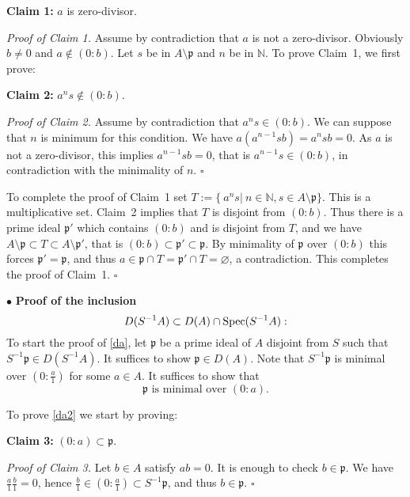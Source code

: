 \documentclass[parskip=half,fontsize=12pt]{scrartcl}%
\newcommand{\mf}{\mathfrak}
\newcommand{\ppp}{\mf p}
\newcommand{\bu}{\bullet}
\begin{document}
\textbf{Claim 1:} $a$ is zero-divisor.

\emph{Proof of Claim 1.} Assume by contradiction that $a$ is not a zero-divisor. Obviously $b\ne0$ and $a\notin(0:b)$. Let $s$ be in $A\setminus\ppp$ and $n$ be in $\mathbb N$. To prove Claim~1, we first prove:

\textbf{Claim 2:} $a^ns\notin(0:b)$.

\emph{Proof of Claim 2.} Assume by contradiction that $a^ns\in(0:b)$. We can suppose that $n$ is minimum for this condition. %
We have $a(a^{n-1}sb)=a^nsb=0$. As $a$ is not a zero-divisor, this implies $a^{n-1}sb=0$, that is $a^{n-1}s\in(0:b)$, in contradiction with the minimality of $n$. $\square$

To complete the proof of Claim~1 set $T:=\{\ a^ns|\ n\in\mathbb N,s\in A\setminus\ppp\}$. This is a multiplicative set. Claim~2 implies that $T$ is disjoint from $(0:b)$. Thus there is a prime ideal $\ppp'$ which contains $(0:b)$ and is disjoint from $T$, and we have $A\setminus\ppp\subset T\subset A\setminus\ppp'$, that is $(0:b)\subset\ppp'\subset\ppp$. By minimality of $\ppp$ over $(0:b)$ this forces $\ppp'=\ppp$, and thus $a\in\ppp\cap T=\ppp'\cap T=\varnothing$, a contradiction. This completes the proof of Claim~1. $\square$ 

$\bu$ \textbf{Proof of the inclusion} 
\begin{equation}\label{da}
D(S^{-1}A)\subset D(A)\cap\operatorname{Spec}(S^{-1}A):
\end{equation}
To start the proof of \eqref{da}, let $\ppp$ be a prime ideal of $A$ disjoint from $S$ such that $S^{-1}\ppp\in D(S^{-1}A)$. It suffices to show $\ppp\in D(A)$. Note that $S^{-1}\ppp$ is minimal over $(0:\frac a1)$ for some $a\in A$. %
It suffices to show that %
\begin{equation}\label{da2}
\ppp\text{ is minimal over }(0:a).
\end{equation}

To prove \eqref{da2} we start by proving:

\textbf{Claim 3:} $(0:a)\subset\ppp$.

\emph{Proof of Claim 3.} Let $b\in A$ satisfy $ab=0$. It is enough to check $b\in\ppp$. We have $\frac a1\frac b1=0$, hence $\frac b1\in(0:\frac a1)\subset S^{-1}\ppp$, and thus $b\in\ppp$. $\square$
\end{document}
